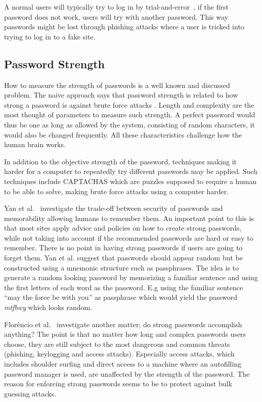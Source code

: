\par A normal users will typically try to log in by trial-and-error~\cite{single-pw-auth}, if the first password does not work, users will try with another password. This way passwords might be lost through phishing attacks where a user is tricked into trying to log in to a fake site. 

\subsection{Password Strength}\label{password-strength}
How to measure the strength of passwords is a well known and discussed problem. The naive approach says that password strength is related to how strong a password is against brute force attacks \cite{password-strength}. Length and complexity are the most thought of parameters to measure such strength. A perfect password would thus be one as long as allowed by the system, consisting of random characters, it would also be changed frequently. All these characteristics challenge how the human brain works. 
\par In addition to the objective strength of the password, techniques making it harder for a computer to repeatedly try different passwords may be applied. Such techniques include CAPTACHAS \cite{captcha} which are puzzles supposed to require a human to be able to solve, making brute force attacks using a computer harder.
\par Yan et al.~\cite{memorability_yan} investigate the trade-off between security of passwords and memorability allowing humans to remember them. An important point to this is that most sites apply advice and policies on how to create strong passwords, while not taking into account if the recommended passwords are hard or easy to remember. There is no point in having strong passwords if users are going to forget them. Yan et al. suggest that passwords should appear random but be constructed using a  mnemonic structure such as passphrases. The idea is to generate a random looking password by memorizing a familiar sentence and using the first letters of each word as the password. E.g using the familiar sentence ``may the force be with you'' as passphrase which would yield the password \emph{mtfbwy} which looks random.
\par Florêncio et al.~\cite{strong-pws_florencio} investigate another matter; do strong passwords accomplish anything? The point is that no matter how long and complex passwords users choose, they are still subject to the most dangerous and common threats (phishing, keylogging and access attacks). Especially access attacks, which includes shoulder surfing and direct access to a machine where an autofilling password manager is used, are unaffected by the strength of the password. The reason for enforcing strong passwords seems to be to protect against bulk guessing attacks. 


